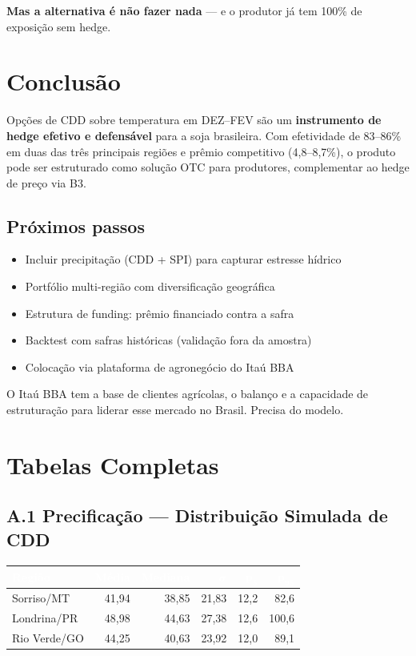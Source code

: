 \documentclass[11pt,a4paper]{article}
\renewcommand{\arraystretch}{1.15}
\newcommand{\destaque}[1]{\textcolor{wolf_blue}{\textbf{#1}}}
\newcommand{\melhordestaque}[1]{\textcolor{wolf_green!50!black}{\textbf{#1}}}
\begin{document}
\noindent
\melhordestaque{Mas a alternativa é não fazer nada} --- e o produtor já tem
100\% de exposição sem hedge.


\section{Conclusão}

Opções de CDD sobre temperatura em DEZ--FEV são um \destaque{instrumento de
hedge efetivo e defensável} para a soja brasileira. Com efetividade de
83--86\% em duas das três principais regiões e prêmio competitivo
(4,8--8,7\%), o produto pode ser estruturado como solução OTC para
produtores, complementar ao hedge de preço via B3.

\subsection*{Próximos passos}

\begin{itemize}
  \item Incluir precipitação (CDD + SPI) para capturar estresse hídrico
  \item Portfólio multi-região com diversificação geográfica
  \item Estrutura de funding: prêmio financiado contra a safra
  \item Backtest com safras históricas (validação fora da amostra)
  \item Colocação via plataforma de agronegócio do Itaú BBA
\end{itemize}

\noindent
O Itaú BBA tem a base de clientes agrícolas, o balanço e a capacidade de
estruturação para liderar esse mercado no Brasil. Precisa do modelo.


\appendix

\section{Tabelas Completas}

\subsection*{A.1 Precificação --- Distribuição Simulada de CDD}
\smallskip
\renewcommand{\arraystretch}{1.2}
\begin{tabular}{lrrrrr}
\toprule
\rowcolor{wolf_blue}\textcolor{white}{\textbf{Região}} &
\textcolor{white}{\textbf{Média}} &
\textcolor{white}{\textbf{Mediana}} &
\textcolor{white}{$\bm{\sigma}$} &
\textcolor{white}{$\bm{p_5}$} &
\textcolor{white}{$\bm{p_{95}}$} \\
\midrule
Sorriso/MT   & 41,94 & 38,85 & 21,83 & 12,2 & 82,6 \\
Londrina/PR  & 48,98 & 44,63 & 27,38 & 12,6 & 100,6 \\
Rio Verde/GO & 44,25 & 40,63 & 23,92 & 12,0 & 89,1 \\
\bottomrule
\end{tabular}
\end{document}
